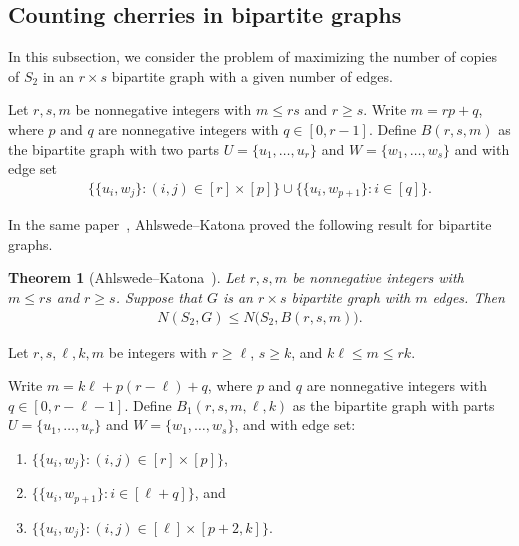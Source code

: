 \documentclass[11pt,a4paper]{article}
\newtheorem{theorem}[definition]{Theorem}
\begin{document}
\subsection{Counting cherries in bipartite graphs}\label{Sec:note-bipartite}
%
In this subsection, we consider the problem of maximizing the number of copies of $S_{2}$ in an $r \times s$ bipartite graph with a given number of edges.

Let $r, s, m$ be nonnegative integers with $m \le rs$ and $r \ge s$.
Write $m = r p + q$, where $p$ and $q$ are nonnegative integers with $q \in [0, r-1]$.
Define $B(r,s,m)$ as the bipartite graph with two parts $U = \{u_1, \ldots, u_{r} \}$ and $W = \{w_1, \ldots, w_{s} \}$ and with edge set
\begin{align*}
    \big\{ \{u_i, w_j\} \colon (i,j) \in [r] \times [p] \big\} 
    \cup \big\{ \{u_i, w_{p+1}\} \colon i \in [q] \big\}. 
\end{align*}

In the same paper~\cite{AK78}, Ahlswede--Katona proved the following result for bipartite graphs. 
%
\begin{theorem}[Ahlswede--Katona~\cite{AK78}]\label{Thm:AK78-bipartite}
    Let $r, s, m$ be nonnegative integers with $m \le rs$ and $r \ge s$. 
    Suppose that $G$ is an $r \times s$ bipartite graph with $m$ edges. 
    Then %
    \begin{align*}
        N(S_2,G) \le N\big( S_2, B(r,s,m) \big). 
    \end{align*}
\end{theorem}

Let $r, s, \ell, k, m$ be integers with $r \ge \ell$, $s \ge k$, and $k \ell \le m \le r k$. 

Write $m = k \ell + p(r - \ell) + q$, where $p$ and $q$ are nonnegative integers with $q \in [0, r -\ell -1]$. 
Define $B_{1}(r, s, m, \ell, k)$ as the bipartite graph with parts $U = \{u_1, \ldots, u_{r} \}$ and $W = \{w_1, \ldots, w_{s} \}$, and with edge set:
\begin{enumerate}[label=(\roman*)]
    \item $\big\{ \{u_i, w_j\} \colon (i,j) \in [r] \times [p] \big\}$, 
    \item $\big\{ \{u_i, w_{p+1}\} \colon i \in [\ell + q] \big\}$, and 
    \item $\big\{ \{u_i, w_j\} \colon (i,j) \in [\ell] \times [p+2, k] \big\}$. 
\end{enumerate}
\end{document}
